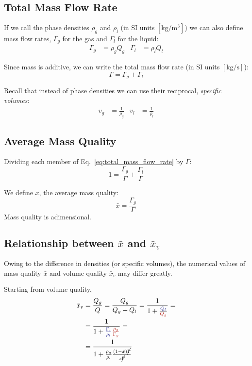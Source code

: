 \subsection{Total Mass Flow Rate}
If we call the phase densities $\rho_g$ and $\rho_l$ (in SI units
$[\si{\kg\per\cubic\metre}]$) we can also define mass flow rates, $\Gamma_g$ for
the gas and $\Gamma_l$ for the liquid:
\begin{align*}
    \Gamma_g &= \rho_g Q_g & \Gamma_l &= \rho_l Q_l
\end{align*}

Since mass is additive, we can write the total mass flow rate (in SI units
$[\si{\kg\per\s}]$):
\begin{equation}
    \Gamma = \Gamma_g + \Gamma_l
    \label{eq:total_mass_flow_rate}
\end{equation}

Recall that instead of phase densities we can use their reciprocal,
\emph{specific volumes}:
\begin{align*}
    v_g &= \frac{1}{\rho_g} & v_l &= \frac{1}{\rho_l}
\end{align*}

\subsection{Average Mass Quality}
Dividing each member of Eq.~\ref{eq:total_mass_flow_rate} by $\Gamma$:
\begin{equation*}
    1 = \frac{\Gamma_g}{\Gamma} + \frac{\Gamma_l}{\Gamma}
\end{equation*}

We define $\bar{x}$, the average mass quality:
\begin{equation*}
    \bar{x} = \frac{\Gamma_g}{\Gamma}
\end{equation*}
Mass quality is adimensional.

\subsection{Relationship between $\bar{x}$ and $\bar{x}_v$} Owing to the
difference in densities (or specific volumes), the numerical values of mass
quality $\bar{x}$ and volume quality $\bar{x}_v$ may differ greatly.

Starting from volume quality,
\begin{align*}
    \bar{x}_v &= \frac{Q_g}{Q} = \frac{Q_g}{Q_g+Q_l} = \frac{1}{1+\frac{\textcolor{Blue}{Q_l}}{\textcolor{BrickRed}{Q_g}}} = \\
    &= \frac{1}{1+\textcolor{Blue}{\frac{\Gamma_l}{\rho_l}}\textcolor{BrickRed}{\frac{\rho_g}{\Gamma_g}}} = \\
    &= \frac{1}{1+\frac{\rho_g}{\rho_l}\frac{(1-\bar{x})\cancel{\Gamma}}{\bar{x}\cancel{\Gamma}}}
\end{align*}

